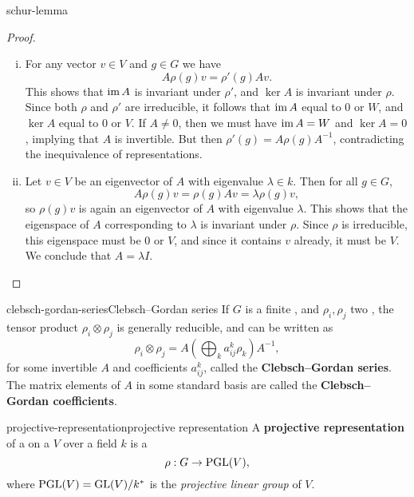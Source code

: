 \begin{example}{schur-lemma}
    \begin{proof}
    \begin{enumerate}[(i)]
        \item For any vector $v \in V$ and $g \in G$ we have
        \[ A \rho(g) v = \rho'(g) A v . \]
        This shows that $\operatorname{im} A$ is invariant under $\rho'$, and $\ker A$ is invariant under $\rho$. Since both $\rho$ and $\rho'$ are irreducible, it follows that $\operatorname{im} A$ equal to $0$ or $W$, and $\ker A$ equal to $0$ or $V$. If $A \ne 0$, then we must have $\operatorname{im} A = W$ and $\ker A = 0$, implying that $A$ is invertible. But then $\rho'(g) = A \rho(g) A^{-1}$, contradicting the inequivalence of representations.
        \item Let $v \in V$ be an eigenvector of $A$ with eigenvalue $\lambda \in k$. Then for all $g \in G$,
        \[ A \rho(g) v = \rho(g) A v = \lambda \rho(g) v , \]
        so $\rho(g) v$ is again an eigenvector of $A$ with eigenvalue $\lambda$. This shows that the eigenspace of $A$ corresponding to $\lambda$ is invariant under $\rho$. Since $\rho$ is irreducible, this eigenspace must be $0$ or $V$, and since it contains $v$ already, it must be $V$. We conclude that $A = \lambda I$.
    \end{enumerate}
    \end{proof}
\end{example}

\begin{topic}{clebsch-gordan-series}{Clebsch--Gordan series}
    If $G$ is a finite , and $\rho_i, \rho_j$ two  , the tensor product $\rho_i \otimes \rho_j$ is generally reducible, and can be written as
    \[ \rho_i \otimes \rho_j = A \left( \bigoplus_k a^k_{ij} \rho_k \right) A^{-1} , \]
    for some invertible $A$ and coefficients $a^k_{ij}$, called the \textbf{Clebsch--Gordan series}. The matrix elements of $A$ in some standard basis are called the \textbf{Clebsch--Gordan coefficients}.
\end{topic}

\begin{topic}{projective-representation}{projective representation}
    A \textbf{projective representation} of a  on a  $V$ over a field $k$ is a 
    \[ \rho : G \to \textup{PGL}(V) , \]
    where $\textup{PGL}(V) = \textup{GL}(V) / k^*$ is the \textit{projective linear group} of $V$.
\end{topic}

